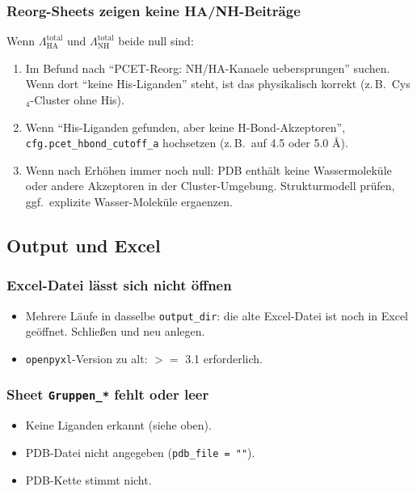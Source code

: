 \documentclass[11pt,a4paper,twoside]{article}
\theoremstyle{remark}
\begin{document}
\subsubsection*{Reorg-Sheets zeigen keine HA/NH-Beitr\"age}

Wenn $\Lambda_\text{HA}^\text{total}$ und $\Lambda_\text{NH}^\text{total}$
beide null sind:

\begin{enumerate}
  \item Im Befund nach ``PCET-Reorg: NH/HA-Kanaele uebersprungen''
        suchen. Wenn dort ``keine His-Liganden'' steht, ist das
        physikalisch korrekt (z.\,B.\ Cys$_4$-Cluster ohne His).
  \item Wenn ``His-Liganden gefunden, aber keine H-Bond-Akzeptoren'',
        \texttt{cfg.pcet\_hbond\_cutoff\_a} hochsetzen (z.\,B.\ auf
        4.5 oder 5.0 \AA{}).
  \item Wenn nach Erh\"ohen immer noch null: PDB enth\"alt keine
        Wassermolek\"ule oder andere Akzeptoren in der Cluster-Umgebung.
        Strukturmodell pr\"ufen, ggf.\ explizite Wasser-Molek\"ule
        ergaenzen.
\end{enumerate}

\subsection{Output und Excel}

\subsubsection*{Excel-Datei l\"asst sich nicht \"offnen}

\begin{itemize}
  \item Mehrere L\"aufe in dasselbe \texttt{output\_dir}: die alte
        Excel-Datei ist noch in Excel ge\"offnet. Schlie\ss en und neu
        anlegen.
  \item \texttt{openpyxl}-Version zu alt: $>=$ 3.1 erforderlich.
\end{itemize}

\subsubsection*{Sheet \texttt{Gruppen\_*} fehlt oder leer}

\begin{itemize}
  \item Keine Liganden erkannt (siehe oben).
  \item PDB-Datei nicht angegeben (\texttt{pdb\_file = ""}).
  \item PDB-Kette stimmt nicht.
\end{itemize}
\end{document}

